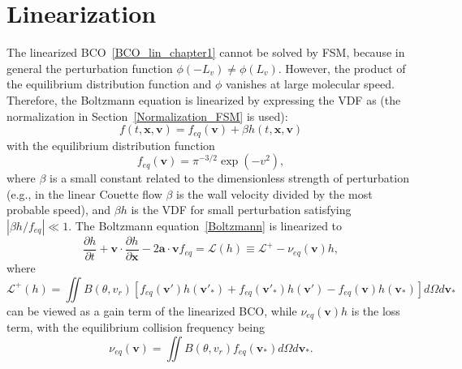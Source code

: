 \section{Linearization}\label{linearization_FSM}

The linearized BCO~\eqref{BCO_lin_chapter1} cannot be solved by FSM, because in general the perturbation function $\phi(-L_v)\neq\phi(L_v)$. However, the product of the equilibrium distribution function and $\phi$ vanishes at large molecular speed. Therefore, the Boltzmann equation is linearized by expressing the VDF as (the normalization in Section~\ref{Normalization_FSM} is used):
\begin{equation}\label{Chapter_lin_VDF}
f(t,\bm{x},\bm{v})=f_{eq}(\bm{v})+\beta{}h(t,\bm{x},\bm{v})
\end{equation}
with the equilibrium distribution function
\begin{equation}\label{equilibrium_Maxwellian_lin}
f_{eq}(\bm{v})=\pi^{-3/2}\exp(-v^{2}),
\end{equation}
where $\beta$ is a small constant related to the dimensionless strength of perturbation (e.g., in the linear Couette flow $\beta$ is the wall velocity divided by the most probable speed), and $\beta{}h$ is the VDF for small perturbation satisfying $|\beta{}h/f_{eq}|\ll1$. The Boltzmann equation~\eqref{Boltzmann} is linearized to
\begin{equation}\label{Chapter1_Boltzmann_lin}
\frac{\partial {h}}{\partial t}+\bm{v}\cdot\frac{\partial{h}}{\partial
	\bm{x}}
-2\bm{a}\cdot\bm{v}f_{eq}=\mathcal{L}(h)\equiv{}\mathcal{L}^+-\nu_{eq}(\bm{v}){h},
\end{equation}
where 
\begin{equation}\label{linearized1}
\mathcal{L}^+(h)=\iint B(\theta,v_r)  [f_{eq}(\bm{v}')h({\bm{v}}'_{\ast})+f_{eq}(\bm{v}'_\ast)h({\bm{v}}')-f_{eq}(\bm{v})h({\bm{v}}_\ast)]d\Omega d{\bm{v}}_\ast
\end{equation}
can be viewed as a gain term of the linearized BCO, while $\nu_{eq}(\bm{v}){h}$ is the loss term, with the equilibrium collision frequency being
\begin{equation}\label{linearized2}
\nu_{eq}(\bm{v})=\iint{}B(\theta,{v}_r)f_{eq}(\bm{v}_{\ast}) d\Omega{d\bm{v}_\ast}.
\end{equation} 




